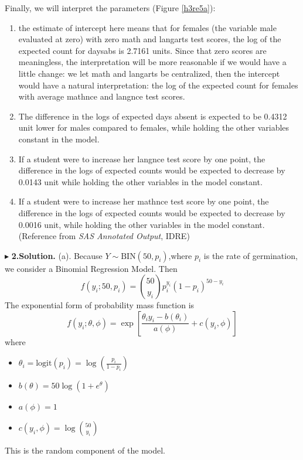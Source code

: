 \documentclass[letterpaper, 12pt]{article}
\begin{document}
         
         
Finally, we will interpret the parameters (Figure \ref{h3re5a}): 
\begin{enumerate}

\item the estimate of intercept here means that for females (the variable male evaluated at zero) with zero math and langarts test scores, the log of the expected count for daysabs is 2.7161 units. Since that zero scores are meaningless, the interpretation will be more reasonable if we would have a little change: we let math and langarts be centralized, then the intercept would have a natural interpretation: the log of the expected count for females with average mathnce and langnce test scores.

\item The difference in the logs of expected days absent is expected to be 0.4312 unit lower for males compared to females, while holding the other variables constant in the model.

\item If a student were to increase her langnce test score by one point, the difference in the logs of expected counts would be expected to decrease by 0.0143 unit while holding the other variables in the model constant.

\item If a student were to increase her mathnce test score by one point, the difference in the logs of expected counts would be expected to decrease by 0.0016 unit, while holding the other variables in the model constant. (Reference from \textit{SAS Annotated Output}, IDRE)
\end{enumerate}

$\blacktriangleright$ \textbf{2.\quad Solution.} 
(a). Because $Y\sim \text{BIN}(50,p_{i})$,where $p_i$ is the rate of germination, we consider a Binomial Regression Model. Then
$$
f(y_i;50,p_i)=\binom{50}{y_i}p_i^{y_i}(1-p_i)^{50-y_i}
$$
The exponential form of probability mass function is
$$
f(y_i;\theta, \phi)=\exp\left[\frac{\theta_iy_i-b(\theta_i)}{a(\phi)}+c(y_i,\phi)\right]
$$
where
\begin{itemize}
\item $\theta_i=\text{logit}(p_i)=\log\left(\frac{p_i}{1-p_i}\right)$
\item $b(\theta)=50\log(1+e^\theta)$
\item $a(\phi)=1$
\item $c(y_i,\phi)=\log\binom{50}{y_i}$
\end{itemize}
This is the random component of the model. 
\end{document}
